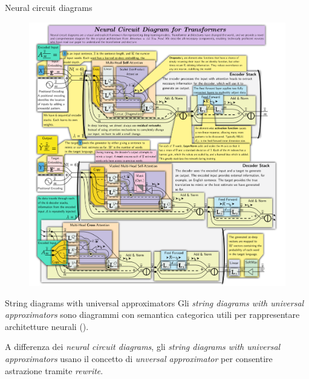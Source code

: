 \documentclass{beamer}
\begin{document}
\begin{frame}{Neural circuit diagrams}
    \begin{figure}
        \begin{center}
            \includegraphics[angle=90,width=1\textwidth]{figures/transformer_ncd.png}
            \caption*{\cite{abbott2023robust}}
        \end{center}
    \end{figure}
\end{frame}

\begin{frame}{String diagrams with universal approximators}
    Gli \textit{string diagrams with universal approximators} sono diagrammi con semantica categorica utili per rappresentare architetture neurali (\cite{khatri2024anatomy}).
    
    A differenza dei \textit{neural circuit diagrams}, gli \textit{string diagrams with universal approximators} usano il concetto di \textit{unversal approximator} per consentire astrazione tramite \textit{rewrite}.
\end{frame}
\end{document}
